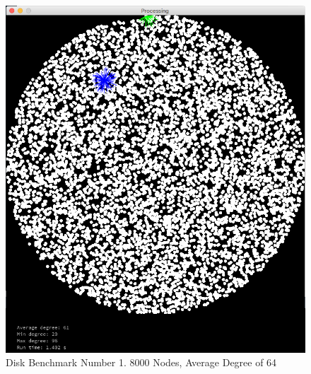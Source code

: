 \documentclass{article}
\begin{document}
\begin{center}
    \begin{figure}
        \includegraphics[scale=0.45]{./images/disk_0.png}
        \caption{Disk Benchmark Number 1. 8000 Nodes, Average Degree of 64}
        \label{disk0}
    \end{figure}
\end{center}
\end{document}
